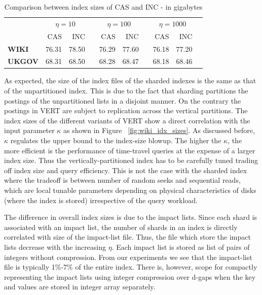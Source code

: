 \begin{table}\centering
\begin{tabular}{@{}lrrrrrrrrr@{}}\toprule
& \multicolumn{2}{c}{\textbf{$\eta=10$}} & \phantom{ab} & \multicolumn{2}{c}{\textbf{$\eta=100$}}& \phantom{ab} & \multicolumn{2}{c}{\textbf{$\eta=1000$}}\\ 
\cmidrule{2-3} \cmidrule{5-6} \cmidrule{8-9}
 & CAS & INC && CAS & INC && CAS & INC\\ \midrule
\textbf{WIKI} & 76.31 & 78.50 && 76.29 & 77.60 && 76.18 & 77.20\\
\textbf{UKGOV} & 68.31 & 68.50 && 68.28 & 68.47 && 68.18 & 68.46\\
 \bottomrule
\end{tabular}
\caption{Comparison between index sizes of CAS and INC - in gigabytes}

\label{tab:sharding_idx_sizes}
\end{table}

As expected, the size of the index files of the sharded indexes is the same as that of the unpartitioned index. This is due to the fact
that sharding partitions the postings of the unpartitioned lists in a
disjoint manner. On the contrary the postings in VERT are
subject to replication across the vertical partitions. The index sizes of the different variants of VERT show a direct correlation with the input
parameter $\kappa$ as shown in Figure ~\ref{fig:wiki_idx_sizes}. As
discussed before, $\kappa$ regulates the upper bound to the index-size
blowup. The higher the $\kappa$, the more efficient is the performance
of time-travel queries at the expense of a larger index
size.  Thus the vertically-partitioned index has to be carefully tuned trading off index size and query
efficiency. This is not the case with the sharded index where the
tradeoff is between number of random seeks and sequential reads, which
are local tunable parameters depending on physical characteristics of
disks (where the index is stored) irrespective of the query
workload. 

The difference in overall index sizes is due to the impact lists. Since each shard is associated with an impact list, the number of shards in an index is directly correlated with size of the impact-list file. Thus, the file which store the impact lists decrease with the increasing $\eta$. Each impact list is stored as list of pairs of integers without compression. From our experiments we see that the impact-list file is typically 1\%-7\% of the entire index. There is, however, scope for compactly representing the impact lists using integer compression over d-gaps when the key and values are stored in integer array separately. 

